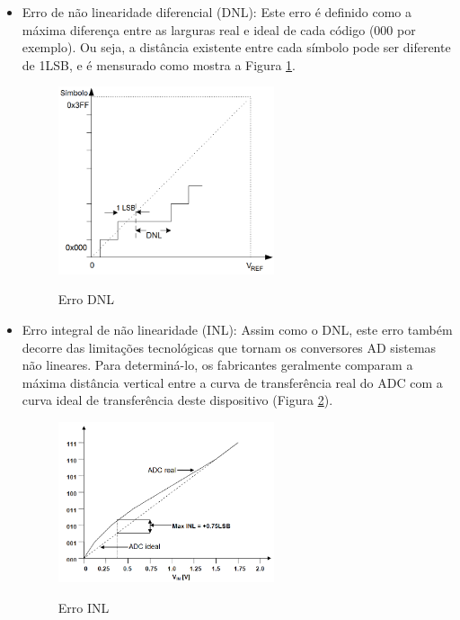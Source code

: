 \documentclass[oneside,openright,12pt]{ufsm_2015} %
\begin{document}
\begin{itemize}
    \item Erro de não linearidade diferencial (DNL):
    Este erro é definido como a máxima diferença entre as larguras real e ideal de cada código (000 por exemplo). Ou seja, a distância existente entre cada símbolo pode ser diferente de 1LSB, e é mensurado como mostra a Figura \ref{fig:dnl-adc}.
    
    \begin{figure}[H]
    \caption{\label{exepretex} Erro DNL}
    \centering
    \includegraphics[width=0.6\textwidth]{figuras/erro_dnl.png}
    \vspace{\baselineskip} %
        \label{fig:dnl-adc}
    \end{figure}
    
    \item Erro integral de não linearidade (INL):
    Assim como o DNL, este erro também decorre das limitações tecnológicas que tornam os conversores AD sistemas não lineares. Para determiná-lo, os fabricantes geralmente comparam a máxima distância vertical entre a curva de transferência real do ADC com a curva ideal de transferência deste dispositivo (Figura \ref{fig:inl-adc}).
    
    \begin{figure}[H]
    \caption{\label{exepretex} Erro INL}
    \centering
    \includegraphics[width=0.6\textwidth]{figuras/adc-inl.png}
    \vspace{\baselineskip} %
        \label{fig:inl-adc}
    \end{figure}
\end{itemize}
\end{document}
